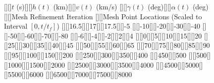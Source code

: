 \documentclass[10pt]{article}
\begin{document}
\begin{figure}[h]
\psfragscanon
{}[][]{\footnotesize$t$ (s)}[][]{\footnotesize$h(t)$ (km)}[][]{\footnotesize$v(t)$ (km/s)}
[][]{\footnotesize$\gamma(t)$ (deg)}[][]{\footnotesize$\alpha(t)$ (deg)}
[][]{\footnotesize Mesh Refinement Iteration}
[][]{\footnotesize Mesh Point Locations (Scaled to Interval $[0,t/t_f]$)} 
[][]{\footnotesize 16.5}[][]{\footnotesize 17}[][]{\footnotesize 17.5}[][]{\footnotesize -5}
[][]{\footnotesize -10}[][]{\footnotesize -20}[][]{\footnotesize -30}[][]{\footnotesize -40}
[][]{\footnotesize -50}[][]{\footnotesize -60}[][]{\footnotesize -70}[][]{\footnotesize -80}
[][]{\footnotesize -6}[][]{\footnotesize -4}[][]{\footnotesize -2}[][]{\footnotesize 2}[][]{\footnotesize 4}
[][]{\footnotesize 0}[][]{\footnotesize 5}[][]{\footnotesize 10}[][]{\footnotesize 15}[][]{\footnotesize 20}
[][]{\footnotesize 25}[][]{\footnotesize 30}[][]{\footnotesize 35}[][]{\footnotesize 40}[][]{\footnotesize 45}
[][]{\footnotesize 50}[][]{\footnotesize 55}[][]{\footnotesize 60}[][]{\footnotesize 65}
[][]{\footnotesize 70}[][]{\footnotesize 75}[][]{\footnotesize 80}[][]{\footnotesize 85}[][]{\footnotesize 90}
[][]{\footnotesize 95}[][]{\footnotesize 100}[][]{\footnotesize 150}[][]{\footnotesize 200}
[][]{\footnotesize 250}[][]{\footnotesize 300}[][]{\footnotesize 350}[][]{\footnotesize 400}
[][]{\footnotesize 450}[][]{\footnotesize 500}
[][]{\footnotesize 500}[][]{\footnotesize 1000}[][]{\footnotesize 1500}[][]{\footnotesize 2000}
[][]{\footnotesize 2500}[][]{\footnotesize 3000}[][]{\footnotesize 3500}[][]{\footnotesize 4000}
[][]{\footnotesize 4500}[][]{\footnotesize 5000}[][]{\footnotesize 5500}[][]{\footnotesize 6000}
[][]{\footnotesize 6500}[][]{\footnotesize 7000}[][]{\footnotesize 7500}[][]{\footnotesize 8000}

\end{figure}
\end{document}
